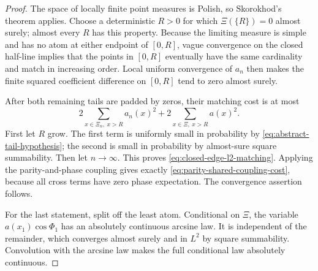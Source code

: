 \begin{proof}
The space of locally finite point measures is Polish, so Skorokhod's theorem
applies.  Choose a deterministic \(R>0\) for which
\(\Xi(\{R\})=0\) almost surely; almost every \(R\) has this property.
Because the limiting measure is simple and has no atom at either endpoint of
\([0,R]\), vague convergence on the closed half-line implies that the
points in \([0,R]\) eventually have the same cardinality and match in
increasing order.  Local uniform convergence of \(a_n\) then makes the
finite squared coefficient difference on \([0,R]\) tend to zero almost
surely.

After both remaining tails are padded by zeros, their matching cost is at
most
\begin{equation}
 2\sum_{x\in\Xi_n,\ x>R}a_n(x)^2
 +2\sum_{x\in\Xi,\ x>R}a(x)^2.
 \label{eq:two-tail-matching-bound}
\end{equation}
First let \(R\) grow.  The first term is uniformly small in probability by
\eqref{eq:abstract-tail-hypothesis}; the second is small in probability by
almost-sure square summability.  Then let \(n\to\infty\).  This proves
\eqref{eq:closed-edge-l2-matching}.  Applying the parity-and-phase coupling
gives exactly \eqref{eq:parity-shared-coupling-cost}, because all cross terms
have zero phase expectation.  The convergence assertion follows.

For the last statement, split off the least atom.  Conditional on \(\Xi\),
the variable \(a(x_1)\cos\Phi_1\) has an absolutely continuous arcsine law.
It is independent of the remainder, which converges almost surely and in
\(L^2\) by square summability.  Convolution with the arcsine law makes the
full conditional law absolutely continuous.
\end{proof}
